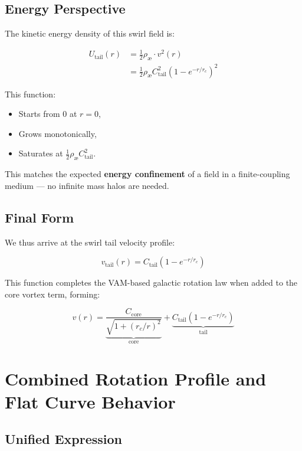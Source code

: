 \documentclass[12pt]{article}
\begin{document}
\subsection{Energy Perspective}

The kinetic energy density of this swirl field is:

\begin{align}
    U_\text{tail}(r)
    &= \frac{1}{2} \rho_{\text{\ae}} \cdot v^2(r) \\
    &= \frac{1}{2} \rho_{\text{\ae}} C_{\text{tail}}^2 \left( 1 - e^{-r/r_c} \right)^2
    \label{eq:tail_energy_density}
\end{align}

This function:
\begin{itemize}
    \item Starts from 0 at \( r=0 \),
    \item Grows monotonically,
    \item Saturates at \( \frac{1}{2} \rho_{\text{\ae}} C_{\text{tail}}^2 \).
\end{itemize}

This matches the expected \textbf{energy confinement} of a field in a finite-coupling medium — no infinite mass halos are needed.

\subsection{Final Form}

We thus arrive at the swirl tail velocity profile:

\begin{equation}
    \boxed{
    v_\text{tail}(r) = C_{\text{tail}} \left(1 - e^{-r/r_c} \right)
    }
\end{equation}

This function completes the VAM-based galactic rotation law when added to the core vortex term, forming:

\[
v(r) = \underbrace{ \frac{C_{\text{core}}}{\sqrt{1 + (r_c/r)^2}} }_{\text{core}} + \underbrace{ C_{\text{tail}} (1 - e^{-r/r_c}) }_{\text{tail}}
\]

\section{Combined Rotation Profile and Flat Curve Behavior}
\label{appendix:combined-vam-profile}

\subsection{Unified Expression}
\end{document}
